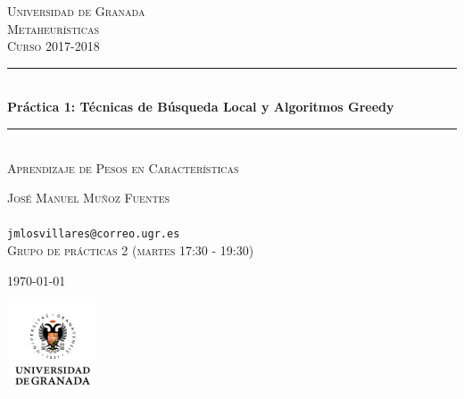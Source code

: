 \documentclass{article}
\begin{document}
\begin{titlepage} %
	\newcommand{\HRule}{\rule{\linewidth}{0.5mm}} %
	
	\center %
	
	
	\textsc{\LARGE Universidad de Granada}\\[1.5cm] %
	
	\textsc{Metaheurísticas}\\[0.3cm] %
	
	\textsc{Curso 2017-2018}\\[0.5cm] %
	
	
	\HRule\\[0.4cm]
	{\huge\bfseries Práctica 1: Técnicas de Búsqueda Local y Algoritmos Greedy}\\[0.4cm] %
	
	\HRule\\[1.5cm]
	
	\textsc{Aprendizaje de Pesos en Características}\\[0.5cm]
	
	\vfill

	\textsc{José Manuel Muñoz Fuentes}\\
	\\
	\texttt{jmlosvillares@correo.ugr.es}\\
	{\footnotesize\textsc{Grupo de prácticas 2 (martes 17:30 - 19:30)}}

	\vfill\vfill\vfill %
	
	{\large\today} %

	\vfill\vfill
	\includegraphics[width=0.2\textwidth]{ugr.png}\\[1cm] %
	
	
	\vfill %
	
\end{titlepage}
\tableofcontents
\end{document}

